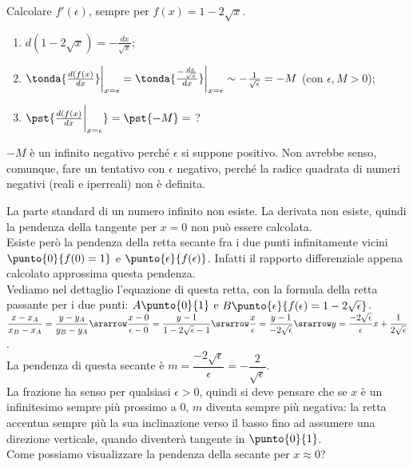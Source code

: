 \begin{esempio}
Calcolare $f'(\epsilon)$, sempre per  $f(x)=1-2\sqrt{x}$.\\
\begin{enumerate} [noitemsep]
 \item $d(1-2\sqrt{x})=-\frac{dx}{\sqrt{x}}$;
 \item $\tonda{\frac{d(f(x)}{dx}}\bigg|_{x=\epsilon}=
  \tonda{\frac{-\frac{dx}{\sqrt{x}}}{dx}}\bigg|_{x=\epsilon}\sim
  -\frac{1}{\sqrt{\epsilon}}=-M$ (con $\epsilon, M >0$);
 \item $\pst{\frac{d(f(x)}{dx}\bigg|_{x=\epsilon}}=\pst{-M}=$ ?
\end{enumerate} 
\begin{osservazione}
 $-M$ è un infinito negativo perché $\epsilon$ si suppone positivo. Non avrebbe 
 senso, comunque, fare un tentativo con $\epsilon$ negativo, perché la radice
 quadrata di numeri negativi (reali e iperreali) non è definita.\\
\end{osservazione} 

La parte standard di un numero infinito non esiste. La derivata non esiste, 
quindi la pendenza della tangente per $x=0$ non può essere calcolata.\\
Esiste però la pendenza della retta secante
fra i due punti infinitamente vicini $\punto{0}{f(0)=1}$ e 
$\punto{\epsilon}{f(\epsilon)}$. Infatti il rapporto 
differenziale appena calcolato approssima questa pendenza.\\
Vediamo nel dettaglio l'equazione di questa retta, con la formula della
retta passante per i due punti: $A\punto{0}{1}$ e 
$B\punto{\epsilon}{f(\epsilon)=1-2\sqrt{\epsilon}}$.\\
$\dfrac{x-x_A}{x_B-x_A}=\dfrac{y-y_A}{y_B-y_A}\srarrow
\dfrac{x-0}{\epsilon-0}=\dfrac{y-1}{1-2\sqrt{\epsilon}-1}\srarrow
\dfrac{x}{\epsilon}=\dfrac{y-1}{-2\sqrt{\epsilon}}\srarrow
y=\dfrac{-2\sqrt{\epsilon}}{\epsilon}x+\dfrac{1}{2\sqrt{\epsilon}}$.\\
La pendenza di questa secante è $m=\dfrac{-2\sqrt{\epsilon}}{\epsilon}=
-\dfrac{2}{\sqrt{\epsilon}}$.\\
La frazione ha senso per qualsiasi $\epsilon>0$, quindi si deve pensare
che se $x$ è un infinitesimo sempre più prossimo a $0$, $m$ diventa
sempre più negativa: la retta accentua sempre più la sua inclinazione verso
il basso fino ad assumere una direzione verticale, quando diventerà tangente in 
$\punto{0}{1}$.\\
Come possiamo visualizzare la pendenza della secante per $x\approx 0$?


\end{esempio}
